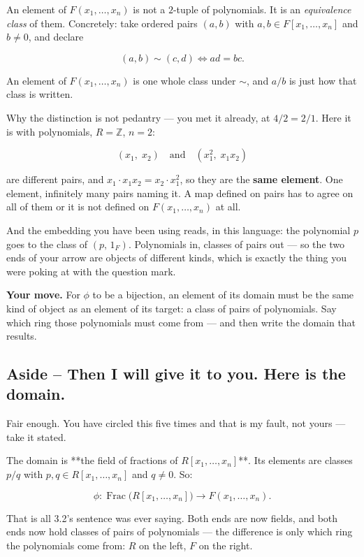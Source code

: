 \documentclass[11pt]{article}
\begin{document}
An element of $F(x_1,\ldots,x_n)$ is not a $2$-tuple of polynomials. It is an \emph{equivalence class} of them. Concretely: take ordered pairs $(a,b)$ with $a,b \in F[x_1,\ldots,x_n]$ and $b \neq 0$, and declare

$$(a,b) \sim (c,d) \iff ad = bc.$$

An element of $F(x_1,\ldots,x_n)$ is one whole class under $\sim$, and $a/b$ is just how that class is written.

Why the distinction is not pedantry --- you met it already, at $4/2 = 2/1$. Here it is with polynomials, $R = \mathbb{Z}$, $n = 2$:

$$(x_1,\; x_2) \quad\text{and}\quad (x_1^2,\; x_1x_2)$$

are different pairs, and $x_1 \cdot x_1 x_2 = x_2 \cdot x_1^2$, so they are the \textbf{same element}. One element, infinitely many pairs naming it. A map defined on pairs has to agree on all of them or it is not defined on $F(x_1,\ldots,x_n)$ at all.

And the embedding you have been using reads, in this language: the polynomial $p$ goes to the class of $(p,\, 1_F)$. Polynomials in, classes of pairs out --- so the two ends of your arrow are objects of different kinds, which is exactly the thing you were poking at with the question mark.

\textbf{Your move.} For $\phi$ to be a bijection, an element of its domain must be the same kind of object as an element of its target: a class of pairs of polynomials. Say which ring those polynomials must come from --- and then write the domain that results.


\subsection*{Aside -- Then I will give it to you. Here is the domain.}
Fair enough. You have circled this five times and that is my fault, not yours --- take it stated.

The domain is **the field of fractions of $R[x_1,\ldots,x_n]$**. Its elements are classes $p/q$ with $p, q \in R[x_1,\ldots,x_n]$ and $q \neq 0$. So:

$$\phi : \operatorname{Frac}\bigl(R[x_1,\ldots,x_n]\bigr) \longrightarrow F(x_1,\ldots,x_n).$$

That is all 3.2's sentence was ever saying. Both ends are now fields, and both ends now hold classes of pairs of polynomials --- the difference is only which ring the polynomials come from: $R$ on the left, $F$ on the right.
\end{document}
